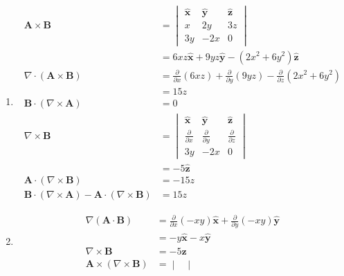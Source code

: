 \documentclass[a4paper]{article}
\begin{document}
\begin{enumerate}[label=(\alph*)]
	\item \begin{align*}
		\pmb{A} \times \pmb{B} & = \begin{vmatrix}
			\pmb{\hat{x}} & \pmb{\hat{y}} & \pmb{\hat{z}} \\
			x & 2y & 3z \\
			3y & -2x & 0
		\end{vmatrix} \\
				       & = 6xz \pmb{\hat{x}} + 9yz \pmb{\hat{y}} - \!\left(2x^{2} + 6y^{2} \right)\pmb{\hat{z}} \\
	\boxed{\nabla \cdot \!\left( \pmb{A} \times \pmb{B} \right)} & = \frac{\partial }{\partial x}\!\left( 6xz \right) + \frac{\partial }{\partial y}\!\left( 9yz \right) - \frac{\partial }{\partial z}\!\left( 2x^{2} + 6y^{2} \right) \\
								     & = \boxed{15z} \\
	\boxed{\pmb{B} \cdot \!\left( \nabla \times \pmb{A} \right)} & = \boxed{0} \\
					       \nabla \times \pmb{B} & = \begin{vmatrix}
					       	\pmb{\hat{x}} & \pmb{\hat{y}} & \pmb{\hat{z}} \\
					       	\frac{\partial }{\partial x} & \frac{\partial }{\partial y} & \frac{\partial }{\partial z} \\
					       	3y & -2x & 0
					       \end{vmatrix} \\
								     & = -5 \pmb{\hat{z}} \\
			\boxed{\pmb{A} \cdot \!\left( \nabla \times \pmb{B} \right)} & = \boxed{-15z} \\
			\boxed{\pmb{B} \cdot \!\left( \nabla \times \pmb{A} \right) - \pmb{A} \cdot \!\left( \nabla \times \pmb{B} \right)} & = \boxed{15z}
	\end{align*}
	\item \begin{align*}
			\boxed{\nabla \!\left( \pmb{A} \cdot \pmb{B} \right)} & = \frac{\partial }{\partial x}\!\left( -xy \right)\pmb{\hat{x}} + \frac{\partial }{\partial y}\!\left( -xy \right)\pmb{\hat{y}} \\
									      & = \boxed{-y \pmb{\hat{x}} - x \pmb{\hat{y}}} \\
							\nabla \times \pmb{B} & = -5 \pmb{\hat{z}} \\
							\boxed{\pmb{A} \times \!\left( \nabla \times \pmb{B} \right)} & = \begin{vmatrix}

\end{vmatrix}
\end{align*}
\end{enumerate}
\end{document}
